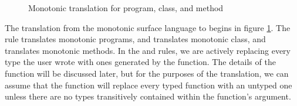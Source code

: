 \documentclass[a4paper,USenglish]{tex/lipics-v2016}
\begin{document}
\begin{figure}[!ht]
\begin{mathpar}





\end{mathpar}
\caption{Monotonic translation for program, class, and method}
\label{fig:mono-trans1}
\end{figure}


The translation from the monotonic surface language to \kafka begins 
in figure \ref{fig:mono-trans1}. The rule  translates 
monotonic programs,  and  translates monotonic class,
and  translates monotonic methods. In the  
and  rules, we are actively replacing every type the user wrote with ones generated by the 
 function. The details of the  function will be 
discussed later, but for the purposes of the translation, we can assume that the
 function will replace every typed function with an untyped one unless
there are no \any types transitively contained within the function's argument.
\end{document}
